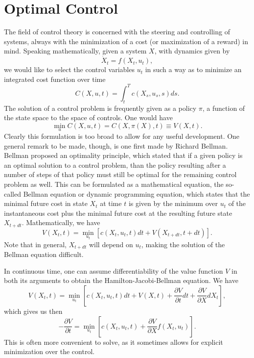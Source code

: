 \section{Optimal Control}
The field of control theory is concerned with the steering and controlling of systems, always with the minimization of a cost (or maximization of a reward) in mind. Speaking mathematically, given a system $X$, with dynamics given by
$$
\dot{X}_t = f(X_t,u_t),
$$
we would like to select the control variables $u_t$ in such a way as to minimize an integrated cost function over time
$$
C(X,u,t) = \int_{t}^T c(X_s,u_s,s) ds.
$$
The solution of a control problem is frequently given as a policy $\pi$, a function of the state space to the space of controls. One would have
$$
\min_u C(X,u,t) = C(X,\pi(X),t) \equiv V(X,t).
$$
Clearly this formulation is too broad to allow for any useful development. One general remark to be made, though, is one first made by Richard Bellman. Bellman\cite{Bellman1952} proposed an optimality principle, which stated that if a given policy is an optimal solution to a control problem, than the policy resulting after a number of steps of that policy must still be optimal for the remaining control problem as well. This can be formulated as a mathematical equation, the so-called Bellman equation or dynamic programming equation, which states that the minimal future cost in state $X_t$ at time $t$ is given by the minimum over $u_t$ of the instantaneous cost plus the minimal future cost at the resulting future state $X_{t+dt}$. Mathematically, we have
$$
V(X_t,t) = \min_{u_t} \left[ c(X_t,u_t,t) dt +V(X_{t+dt},t+dt)\right].
$$
Note that in general, $X_{t+dt}$ will depend on $u_t$, making the solution of the Bellman equation difficult.\par
In continuous time, one can assume differentiability of the value function $V$ in both its arguments to obtain the Hamilton-Jacobi-Bellman equation. We have
$$
V(X_t,t) = \min_{u_t} \left[c(X_t,u_t,t) dt + V(X,t) + \frac{\partial V}{\partial t} dt + \frac{\partial V}{\partial X} dX_t \right],
$$
which gives us then
$$
-\frac{\partial V}{\partial t} = \min_{u_t} \left[c(X_t,u_t,t) + \frac{\partial V}{\partial X} f(X_t,u_t) \right].
$$
This is often more convenient to solve, as it sometimes allows for explicit minimization over the control.


